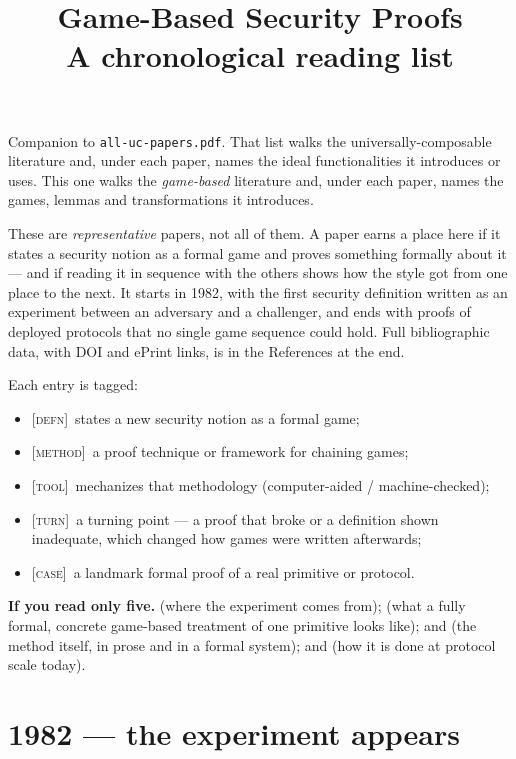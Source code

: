 \documentclass[11pt]{article}
\title{\vspace{-2.5em}Game-Based Security Proofs\\[.2em]
       \large A chronological reading list}
\author{}
\date{}
\newcommand{\kind}[1]{{\footnotesize\textsc{\textcolor{yearcolor}{[#1]}}}\ }
\newcommand{\defn}{\kind{defn}}
\newcommand{\method}{\kind{method}}
\newcommand{\tool}{\kind{tool}}
\newcommand{\turn}{\kind{turn}}
\newcommand{\case}{\kind{case}}
\begin{document}
\maketitle
\vspace{-3.5em}

\noindent
Companion to \texttt{all-uc-papers.pdf}. That list walks the
universally-composable literature and, under each paper, names the ideal
functionalities it introduces or uses. This one walks the \emph{game-based}
literature and, under each paper, names the games, lemmas and transformations
it introduces.

\medskip\noindent
These are \emph{representative} papers, not all of them. A paper earns a place
here if it states a security notion as a formal game and proves something
formally about it --- and if reading it in sequence with the others shows how
the style got from one place to the next. It starts in 1982, with the first
security definition written as an experiment between an adversary and a
challenger, and ends with proofs of deployed protocols that no single game
sequence could hold. Full bibliographic data, with DOI and ePrint links, is in
the References at the end.

\medskip\noindent
Each entry is tagged:

\begin{itemize}[leftmargin=2em, itemsep=1pt, topsep=3pt]
  \item \defn states a new security notion as a formal game;
  \item \method a proof technique or framework for chaining games;
  \item \tool mechanizes that methodology (computer-aided / machine-checked);
  \item \turn a turning point --- a proof that broke or a definition shown
    inadequate, which changed how games were written afterwards;
  \item \case a landmark formal proof of a real primitive or protocol.
\end{itemize}

\medskip\noindent
\textbf{If you read only five.} \cite{GM82} (where the experiment comes from);
\cite{BDJR97} (what a fully formal, concrete game-based treatment of one
primitive looks like); \cite{Shou04} and \cite{BR04} (the method itself, in
prose and in a formal system); and \cite{SSP18} (how it is done at protocol
scale today).

\section{1982 --- the experiment appears}
\end{document}
